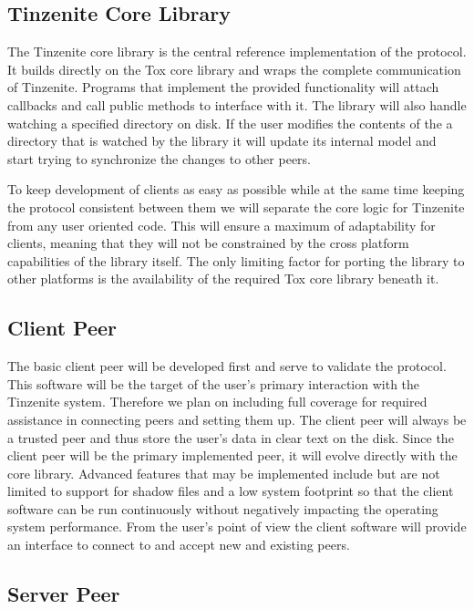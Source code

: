 \subsection{Tinzenite Core Library}

The Tinzenite core library is the central reference implementation of the protocol.
It builds directly on the Tox core library and wraps the complete communication of Tinzenite.
Programs that implement the provided functionality will attach callbacks and call public methods to interface with it.
The library will also handle watching a specified directory on disk.
If the user modifies the contents of the a directory that is watched by the library it will update its internal model and start trying to synchronize the changes to other peers.

To keep development of clients as easy as possible while at the same time keeping the protocol consistent between them we will separate the core logic for Tinzenite from any user oriented code.
This will ensure a maximum of adaptability for clients, meaning that they will not be constrained by the cross platform capabilities of the library itself.
The only limiting factor for porting the library to other platforms is the availability of the required Tox core library beneath it.

\subsection{Client Peer}

The basic client peer will be developed first and serve to validate the protocol.
This software will be the target of the user's primary interaction with the Tinzenite system.
Therefore we plan on including full coverage for required assistance in connecting peers and setting them up.
The client peer will always be a trusted peer and thus store the user's data in clear text on the disk.
Since the client peer will be the primary implemented peer, it will evolve directly with the core library.
Advanced features that may be implemented include but are not limited to support for shadow files and a low system footprint so that the client software can be run continuously without negatively impacting the operating system performance.
From the user's point of view the client software will provide an interface to connect to and accept new and existing peers.

\subsection{Server Peer}

